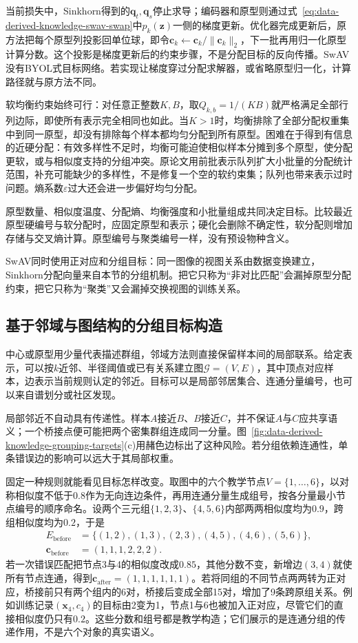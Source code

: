 当前损失中，Sinkhorn得到的$\bm{q}_t,\bm{q}_s$停止求导；编码器和原型则通过式~\eqref{eq:data-derived-knowledge-swav-swap}中$p_k(\bm{z})$一侧的梯度更新。优化器完成更新后，原方法把每个原型列投影回单位球，即令$\bm{c}_k\leftarrow\bm{c}_k/\lVert\bm{c}_k\rVert_2$，下一批再用归一化原型计算分数。这个投影是梯度更新后的约束步骤，不是分配目标的反向传播。SwAV没有BYOL式目标网络。若实现让梯度穿过分配求解器，或省略原型归一化，计算路径就与原方法不同。

软均衡约束始终可行：对任意正整数$K,B$，取$Q_{k,b}=1/(KB)$就严格满足全部行列边际，即使所有表示完全相同也如此。当$K>1$时，均衡排除了全部分配权重集中到同一原型，却没有排除每个样本都均匀分配到所有原型。困难在于得到有信息的近硬分配：有效多样性不足时，均衡可能迫使相似样本分摊到多个原型，使分配更软，或与相似度支持的分组冲突。原论文用前批表示队列扩大小批量的分配统计范围，补充可能缺少的多样性，不是修复一个空的软约束集；队列也带来表示过时问题。熵系数$\varepsilon$过大还会进一步偏好均匀分配。

原型数量、相似度温度、分配熵、均衡强度和小批量组成共同决定目标。比较最近原型硬编号与软分配时，应固定原型和表示；硬化会删除不确定性，软分配则增加存储与交叉熵计算。原型编号与聚类编号一样，没有预设物种含义。

SwAV同时使用正对应和分组目标：同一图像的视图关系由数据变换建立，Sinkhorn分配向量来自本节的分组机制。把它只称为“非对比匹配”会漏掉原型分配约束，把它只称为“聚类”又会漏掉交换视图的训练关系。

\subsection{基于邻域与图结构的分组目标构造}
\label{sec:data-derived-knowledge-graph-targets}

中心或原型用少量代表描述群组，邻域方法则直接保留样本间的局部联系。给定表示，可以按$k$近邻、半径阈值或已有关系建立图$\mathcal{G}=(V,E)$，其中顶点对应样本，边表示当前规则认定的邻近。目标可以是局部邻居集合、连通分量编号，也可以来自谱划分或社区发现。

局部邻近不自动具有传递性。样本$A$接近$B$、$B$接近$C$，并不保证$A$与$C$应共享语义；一个桥接点便可能把两个密集群组连成同一分量。图~\ref{fig:data-derived-knowledge-grouping-targets}(c)用赭色边标出了这种风险。若分组依赖连通性，单条错误边的影响可以远大于其局部权重。

固定一种规则就能看见目标怎样改变。取图中的六个教学节点$V=\{1,\ldots,6\}$，以对称相似度不低于$0.8$作为无向连边条件，再用连通分量生成组号，按各分量最小节点编号的顺序命名。设两个三元组$\{1,2,3\}$、$\{4,5,6\}$内部两两相似度均为$0.9$，跨组相似度均为$0.2$，于是
\[
  \begin{aligned}
    E_{\mathrm{before}}
    &=\{(1,2),(1,3),(2,3),(4,5),(4,6),(5,6)\},\\
    \bm{c}_{\mathrm{before}}&=(1,1,1,2,2,2).
  \end{aligned}
\]
若一次错误匹配把节点3与4的相似度改成$0.85$，其他分数不变，新增边$(3,4)$就使所有节点连通，得到$\bm{c}_{\mathrm{after}}=(1,1,1,1,1,1)$。若将同组的不同节点两两转为正对应，桥接前只有两个组内的6对，桥接后变成全部15对，增加了9条跨原组关系。例如训练记录$(\bm{x}_4,c_4)$的目标由2变为1，节点1与6也被加入正对应，尽管它们的直接相似度仍只有$0.2$。这些分数和组号都是教学构造；它们展示的是连通分组的传递作用，不是六个对象的真实语义。

